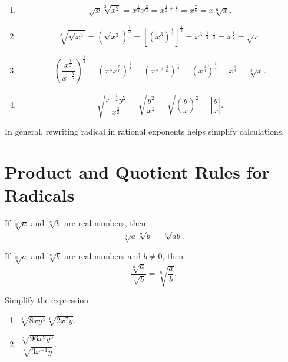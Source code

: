 \documentclass[
  en,11pt]{elegantbook}
\newcommand{\size}[2]{{\fontsize{#1}{0}\selectfont#2}}
\newenvironment{rmdnote}{
	\vspace*{0.5\baselineskip}
    \par\noindent
    \makebox[-3pt][r]{\color{red!90}\size{8}{\textdbend}\,\,}
    \begin{tcolorbox}[
    title={\textbf{\color{second}Note}},
    title style={left color=blue!10!green!20!white,right color=yellow!20!blue!20!white},
    colback=red!10!white,
    ]
    \itshape
}{
    \end{tcolorbox}
    \par\ignorespacesafterend
}
\let\BeginKnitrBlock\begin \let\EndKnitrBlock\end
\begin{document}
\BeginKnitrBlock{solution}
{}\\

\begin{enumerate}
\def\labelenumi{\arabic{enumi}.}

\item
  \[\sqrt{x}\sqrt[3]{x^2}=x^{\frac12}x^{\frac{2}{3}}=x^{\frac{1}{2}+\frac{2}{3}}=x^\frac{7}{6}=x\sqrt[6]{x}.\]
\item
  \[
  \sqrt[3]{\sqrt{x^3}}=(\sqrt{x^3})^\frac{1}{3}=[(x^3)^{\frac{1}{2}}]^{\frac{1}{3}}=x^{3\cdot\frac{1}{2}\cdot\frac{1}{3}}=x^{\frac{1}{2}}=\sqrt{x}.
  \]
\item
  \[
  \left(\frac{x^{\frac12}}{x^{-\frac56}}\right)^{\frac14}=(x^{\frac12}x^{\frac56})^{\frac14}=(x^{\frac{1}{2}+\frac{5}{6}})^{\frac{1}{4}}=(x^\frac{4}{3})^{\frac{1}{4}}=x^{\frac{1}{3}}=\sqrt[3]{x}.
  \]
\item
  \[
  \sqrt{\frac{x^{-\frac12}y^2}{x^{\frac32}}}=\sqrt{\frac{y^2}{x^2}}=\sqrt{\left(\frac yx\right)^2}=\left|\frac yx\right|.
  \]
\end{enumerate}
\EndKnitrBlock{solution}

\begin{rmdnote}

In general, rewriting radical in rational exponents helps simplify calculations.

\end{rmdnote}

\hypertarget{product-and-quotient-rules-for-radicals}{%
\section{Product and Quotient Rules for Radicals}\label{product-and-quotient-rules-for-radicals}}

If \(\sqrt[n]{a}\) and \(\sqrt[n]{b}\) are real numbers, then
\[{\sqrt[n]a}{\sqrt[n]b}=\sqrt[n]{ab}.\]

If \(\sqrt[n]a\) and \(\sqrt[n]b\) are real numbers and \(b\neq 0\), then
\[\dfrac{\sqrt[n]a}{\sqrt[n]b}=\sqrt[n]{\dfrac ab}.\]

\BeginKnitrBlock{example}
\protect\hypertarget{exm:unnamed-chunk-74}{}{\label{exm:unnamed-chunk-74} }
Simplify the expression.

\begin{enumerate}
\def\labelenumi{\arabic{enumi}.}

\item
  \(\sqrt[4]{8xy^4}\sqrt[4]{2x^7y}\).
\item
  \(\dfrac{\sqrt[5]{96x^9y^3}}{\sqrt[5]{3x^{-1}y}}\).
\end{enumerate}
\EndKnitrBlock{example}
\end{document}
